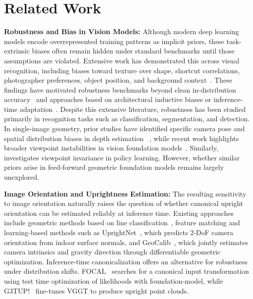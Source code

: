 \section{Related Work}

\textbf{Robustness and Bias in Vision Models:}
Although modern deep learning models encode overrepresented training patterns as implicit priors, these task-extrinsic biases often remain hidden under standard benchmarks until those assumptions are violated.
Extensive work has demonstrated this across visual recognition, including biases toward texture over shape, shortcut correlations, photographer preferences, object position, and background context~\citep{geirhos2018imagenet, geirhos2020shortcut, torralba2011unbiased, xiao2020noise, liu2026optigeoefficientmonoculargeometry}.
These findings have motivated robustness benchmarks beyond clean in-distribution accuracy~\citep{hendrycks2019benchmarking} and approaches based on architectural inductive biases or inference-time adaptation~\citep{cohen2016group, weiler2019general, sun2020test, wang2020tent}.
Despite this extensive literature, robustness has been studied primarily in recognition tasks such as classification, segmentation, and detection. 
In single-image geometry, prior studies have identified specific camera pose and spatial distribution biases in depth estimation ~\citep{vandijk2019neuralnetworksdepthsingle, zhao2021cameraposemattersimproving}, while recent work highlights broader viewpoint instabilities in vision foundation models~\citep{michalkiewicz2024viewscreatedequalanalyzing}. Similarly, \cite{jiang2025youviewpointinvariant} investigates viewpoint invariance in policy learning.
However, whether similar priors arise in feed-forward geometric foundation models remains largely unexplored.

\textbf{Image Orientation and Uprightness Estimation:}
The resulting sensitivity to image orientation naturally raises the question of whether canonical upright orientation can be estimated reliably at inference time.
Existing approaches include geometric methods based on line classification~\citep{ctrlc, lee2021ctrl}, feature matching \citep{nordstrom2026whohandlesorientationcvpr, nordstrom2026lomawhohandlesorientationeccv} and learning-based methods such as UprightNet~\citep{xian2019uprightnet}, which predicts 2-DoF camera orientation from indoor surface normals, and GeoCalib~\citep{veicht2024geocalib}, which jointly estimates camera intrinsics and gravity direction through differentiable geometric optimization.
Inference-time canonicalization offers an alternative for robustness under distribution shifts. 
FOCAL~\citep{singhal2025testtimeimageCanonicalization} searches for a canonical input transformation using test time optimization of likelihoods with foundation-model, while G3TUP!~\citep{kani2026g3t} fine-tunes VGGT to produce upright point clouds. 

